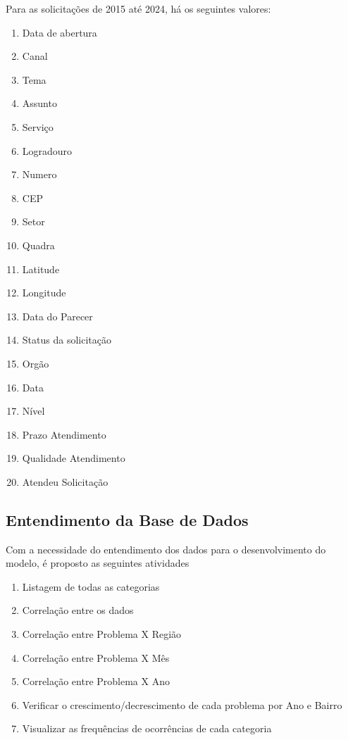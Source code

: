 \documentclass[a4paper,12pt]{article}
\begin{document}
Para as solicitações de 2015 até 2024, há os seguintes valores:
\begin{enumerate}
    \item Data de abertura
    \item Canal
    \item Tema
    \item Assunto
    \item Serviço
    \item Logradouro
    \item Numero
    \item CEP
    \item Setor
    \item Quadra
    \item Latitude
    \item Longitude
    \item Data do Parecer
    \item Status da solicitação
    \item Orgão
    \item Data
    \item Nível
    \item Prazo Atendimento
    \item Qualidade Atendimento
    \item Atendeu Solicitação
\end{enumerate}

\subsection{Entendimento da Base de Dados}

Com a necessidade do entendimento dos dados para o desenvolvimento do modelo, é proposto as seguintes atividades

\begin{enumerate}
    \item Listagem de todas as categorias
    \item Correlação entre os dados
    \item Correlação entre Problema X Região
    \item Correlação entre Problema X Mês
    \item Correlação entre Problema X Ano
    \item Verificar o crescimento/decrescimento de cada problema por Ano e Bairro
    \item Visualizar as frequências de ocorrências de cada categoria
\end{enumerate}
\end{document}
